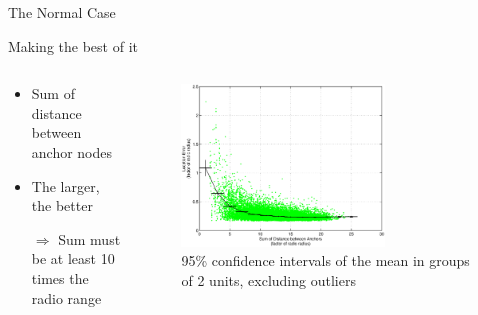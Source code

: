 \documentclass{beamer}
\begin{document}
\begin{frame}{The Normal Case}
\begin{block}{Making the best of it}
\begin{columns}
	\begin{column}[T]{0.3\textwidth}
		\begin{itemize}
			\item Sum of distance between anchor nodes
			\item The larger, the better
			\item[$\Rightarrow$] Sum must be at least 10 times the radio range
		\end{itemize}
		\vfill
	\end{column}
	\begin{column}[T]{0.7\textwidth}
		\begin{figure}
		  \centering
			\includegraphics[width=0.7\textwidth]{SumOfDistanceIndicator_square}
			\caption{95\% confidence intervals of the mean in groups of 2 units, excluding outliers}
		\end{figure}
	\end{column}
\end{columns}
\end{block}
\end{frame}
\end{document}
